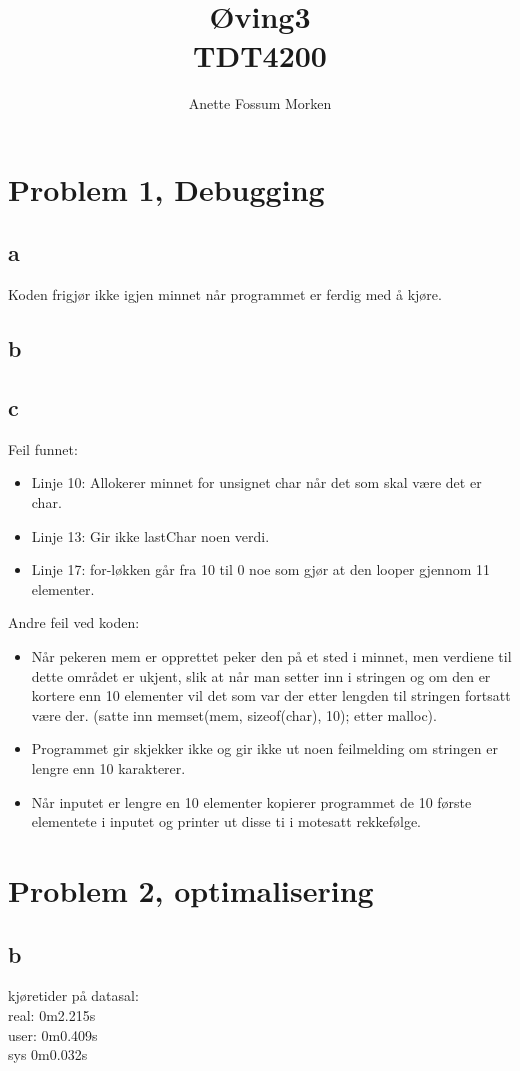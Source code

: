 \documentclass[12pt, a4paper]{article} %
\title{Øving3\\ TDT4200}
\author[1]{Anette Fossum Morken}
\date{}
\begin{document}
\maketitle
\section*{Problem 1, Debugging}
\subsection*{a}
Koden frigjør ikke igjen minnet når programmet er ferdig med å kjøre.

\subsection*{b}

\subsection*{c}
Feil funnet:
\begin{itemize}
\item Linje 10: Allokerer minnet for unsignet char når det som skal være det er char.
\item Linje 13: Gir ikke lastChar noen verdi.
\item Linje 17: for-løkken går fra 10 til 0 noe som gjør at den looper gjennom 11 elementer.
\end{itemize}
Andre feil ved koden:
\begin{itemize}
\item Når pekeren mem er opprettet peker den på et sted i minnet, men verdiene til dette området er ukjent, slik at når man setter inn i stringen og om den er kortere enn 10 elementer vil det som var der etter lengden til stringen fortsatt være der. (satte inn memset(mem, sizeof(char), 10); etter malloc).
\item Programmet gir skjekker ikke og gir ikke ut noen feilmelding om stringen er lengre enn 10 karakterer.
\item Når inputet er lengre en 10 elementer kopierer programmet de 10 første elementete i inputet og printer ut disse ti i motesatt rekkefølge.
\end{itemize}
\section*{Problem 2, optimalisering}
\subsection*{b}
kjøretider på datasal:\\
real: 0m2.215s \\
user: 0m0.409s \\
sys 0m0.032s\\
\end{document}
